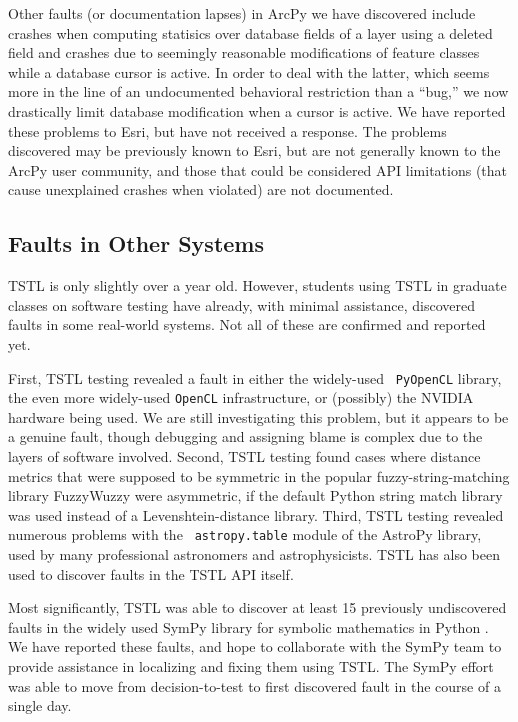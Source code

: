 Other faults (or documentation lapses) in ArcPy we have discovered include crashes when computing
statisics over database fields of a layer using a deleted field and
crashes due to seemingly reasonable modifications of feature classes
while a database cursor is active.  In order to deal with the latter,
which seems more in the line of an undocumented behavioral restriction
than a ``bug,'' we now drastically limit database modification when a
cursor is active.  We have reported these problems to Esri, but have
not received a response.  The problems discovered may be previously
known to Esri, but are not generally known to the ArcPy user
community, and those that could be considered API limitations (that
cause unexplained crashes when violated) are not documented.

\subsection{Faults in Other Systems}

TSTL  is only slightly over a year old.  However, students using
TSTL in graduate classes on software testing have already, with
minimal assistance, discovered faults in some real-world systems.  Not
all of these are confirmed and reported yet.

First, TSTL testing revealed a fault in either the widely-used {\tt
  PyOpenCL} library, the even more widely-used {\tt OpenCL}
infrastructure, or (possibly) the NVIDIA hardware being used.  We are
still investigating this problem, but it appears to be a genuine
fault, though debugging and assigning blame is complex due to the
layers of software involved.  Second, TSTL testing found cases where distance metrics that were supposed to
be symmetric in the popular fuzzy-string-matching library FuzzyWuzzy
were asymmetric, if the default Python string match library was used
instead of a Levenshtein-distance library.
Third, TSTL testing revealed numerous problems with the {\tt
  astropy.table} module of the AstroPy
library, used by many professional astronomers and astrophysicists.
TSTL has also been used to discover faults in the TSTL API itself.

Most significantly, TSTL was able to discover at least 15
previously undiscovered faults in the widely used SymPy library for
symbolic mathematics in Python \cite{sympy}.  We have reported these
faults, and hope to collaborate with the SymPy team to provide
assistance in localizing and fixing them using TSTL.  The SymPy
effort was able to move from
decision-to-test to first discovered fault in the course of a single day.